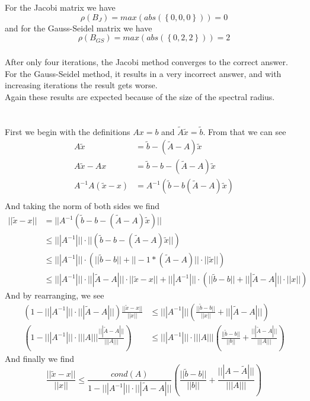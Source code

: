 \documentclass{article}
\begin{document}
\subsubsection{}
For the Jacobi matrix we have 
\[\rho(B_J)
= max\left(abs\left(\left\{0,0,0\right\}\right)\right)
= 0\]
and for the Gauss-Seidel matrix we have
\[\rho(B_{GS})
= max\left(abs\left(\left\{0,2,2\right\}\right)\right)
= 2\]
\subsubsection{}
After only four iterations, the Jacobi method converges to the correct
answer.\\ For the Gauss-Seidel method, it results in a very incorrect
answer, and with increasing iterations the result gets worse. \\ Again
these results are expected because of the size of the spectral radius.

\section{}
First we begin with the definitions \(Ax=b\) and \(\tilde{A}\tilde{x}
= \tilde{b}\). From that we can see
\begin{align*}
  A\tilde{x} &= \tilde{b} - (\tilde{A} - A)\tilde{x}\\
  A\tilde{x} - Ax &= \tilde{b} - b - (\tilde{A} - A)\tilde{x}\\
  A^{-1}A(\tilde{x} - x) &= A^{-1}(\tilde{b}-b(\tilde{A}-A)\tilde{x})\\
\end{align*}
And taking the norm of both sides we find
\begin{align*}
  ||\tilde{x} - x|| &= ||A^{-1}(\tilde{b} - b - (\tilde{A} - A)\tilde{x})||\\
  &\leq |||A^{-1}|||\cdot||(\tilde{b} - b - (\tilde{A} - A)\tilde{x}||)\\
  &\leq |||A^{-1}|||\cdot(||\tilde{b} - b|| + ||-1*(\tilde{A} - A)||\cdot||\tilde{x}||)\\
  &\leq |||A^{-1}|||\cdot|||\tilde{A} - A|||\cdot||\tilde{x} - x||
      + |||A^{-1}|||\cdot(||\tilde{b} - b|| + |||\tilde{A} - A|||\cdot||x||)
\end{align*}
And by rearranging, we see
\begin{align*}
  (1-|||A^{-1}|||\cdot|||\tilde{A}-A|||)\frac{||\tilde{x}-x||}{||x||}
  &\leq |||A^{-1}|||\left(\frac{||\tilde{b}-b||}{||x||} + |||\tilde{A}-A|||\right)\\
  \left(1-|||A^{-1}|||\cdot|||A|||\frac{|||\tilde{A}-A|||}{|||A|||}\right)
  &\leq |||A^{-1}|||\cdot|||A||| \left(\frac{||\tilde{b}-b||}{||b||} +
  \frac{|||\tilde{A}-A|||}{|||A|||}\right)
\end{align*}
And finally we find
\[
\frac{||\tilde{x}-x||}{||x||} \leq
\frac{cond(A)}{1-|||A^{-1}|||\cdot|||\tilde{A}-A|||}
\left(\frac{||\tilde{b}-b||}{||b||} + \frac{|||A-\tilde{A}|||}{|||A|||}\right)
\]
\end{document}
